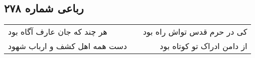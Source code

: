 \begin{center}
\section*{رباعی شماره ۲۷۸}
\label{sec:sh278}
\begin{longtable}{l p{0.5cm} r}
هر چند که جان عارف آگاه بود
&&
کی در حرم قدس تواش راه بود
\\
دست همه اهل کشف و ارباب شهود
&&
از دامن ادراک تو کوتاه بود
\\
\end{longtable}
\end{center}
